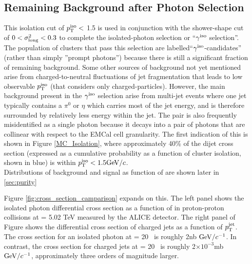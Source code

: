 \subsection{Remaining Background after Photon Selection}

This isolation cut of {$p_{\mathrm{T}}^\mathrm{iso}<$ 1.5 \GeVc} is used in conjunction with the shower-shape cut  of $0<\sigma^{2}_{\mathrm{long}}<0.3$ to complete the isolated-photon selection or ``$\gamma^\mathrm{iso}$ selection''. The population of clusters that pass this selection are labelled``$\gamma^\mathrm{iso}$-candidates'' (rather than simply ''prompt photons'') because there is still a significant fraction of remaining background. Some other sources of background not yet mentioned arise from charged-to-neutral fluctuations of jet fragmentation that leads to low observable $p_{\mathrm{T}}^\mathrm{iso}$ (that considers only charged-particles). However, the main background present in the $\gamma^\mathrm{iso}$ selection arise from multi-jet events where one jet typically contains a $\pi^{0}$ or $\eta$ which carries most of the jet energy, and is therefore surrounded by relatively less energy within the jet. The pair is also frequently misidentified as a single photon because it decays into a pair of photons that are collinear with respect to the EMCal cell granularity. The first indication of this is shown in Figure \ref{MC_Isolation}, where approximately 40\% of the dijet cross section (expressed as a cumulative probability as a function of cluster isolation, shown in blue) is within $p_{\mathrm{T}}^\mathrm{iso} < 1.5 \mathrm{GeV}/c$.\\ Distributions of background and signal as function of \lambdasquare are shown later in \ref{sec:purity}

Figure \ref{fig:cross_section_camparison} expands on this. The left panel shows the isolated photon differential cross section as a function of \ptgamma in proton-proton collisions at \sqrts = 5.02 TeV measured by the ALICE detector. The right panel of Figure shows the differential cross section of charged jets as a function of $p_{\mathrm{T}}^\mathrm{jet}$. The cross section for an isolated photon at \pt = 20 \GeVc~is roughly 2nb $\mathrm{GeV}/c^{-1}$. In contrast, the cross section for charged jets at \pt = 20 \GeVc~is roughly 2$\times10^{-3}$mb $\mathrm{GeV}/c^{-1}$, approximately three orders of magnitude larger. 

